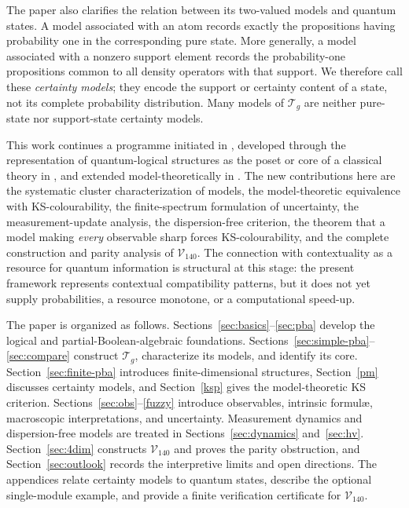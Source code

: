 \documentclass{article}   	%
\theoremstyle{plain}
\theoremstyle{definition}
\theoremstyle{remark}
\begin{document}
The paper also clarifies the relation between its two-valued models and quantum states.  A model associated with an atom records exactly the propositions having probability one in the corresponding pure state.  More generally, a model associated with a nonzero support element records the probability-one propositions common to all density operators with that support.  We therefore call these \emph{certainty models}; they encode the support or certainty content of a state, not its complete probability distribution.  Many models of $\mathcal T_g$ are neither pure-state nor support-state certainty models.

This work continues a programme initiated in \cite{Malhas1987}, developed through the representation of quantum-logical structures as the poset or core of a classical theory in \cite{malhas1992quantum,mal2}, and extended model-theoretically in \cite{Malhas1995}.  The new contributions here are the systematic cluster characterization of models, the model-theoretic equivalence with KS-colourability, the finite-spectrum formulation of uncertainty, the measurement-update analysis, the dispersion-free criterion, the theorem that a model making \emph{every} observable sharp forces KS-colourability, and the complete construction and parity analysis of $\mathcal V_{140}$.  The connection with contextuality as a resource for quantum information \cite{Cabello2014,Howard2014} is structural at this stage: the present framework represents contextual compatibility patterns, but it does not yet supply probabilities, a resource monotone, or a computational speed-up.

The paper is organized as follows.  Sections~\ref{sec:basics}--\ref{sec:pba} develop the logical and partial-Boolean-algebraic foundations.  Sections~\ref{sec:simple-pba}--\ref{sec:compare} construct $\mathcal T_g$, characterize its models, and identify its core.  Section~\ref{sec:finite-pba} introduces finite-dimensional structures, Section~\ref{pm} discusses certainty models, and Section~\ref{ksp} gives the model-theoretic KS criterion.  Sections~\ref{sec:obs}--\ref{fuzzy} introduce observables, intrinsic formul\ae, macroscopic interpretations, and uncertainty.  Measurement dynamics and dispersion-free models are treated in Sections~\ref{sec:dynamics} and~\ref{sec:hv}.  Section~\ref{sec:4dim} constructs $\mathcal V_{140}$ and proves the parity obstruction, and Section~\ref{sec:outlook} records the interpretive limits and open directions.  The appendices relate certainty models to quantum states, describe the optional single-module example, and provide a finite verification certificate for $\mathcal V_{140}$.
\end{document}
